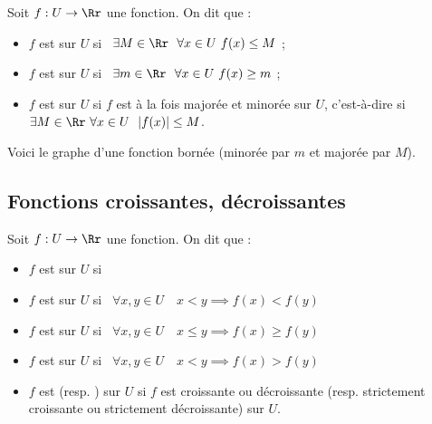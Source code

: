 \documentclass[class=report,crop=false]{standalone}
\begin{document}
\begin{definition}
Soit $f:U\to \Rr$ une fonction. On dit que :
\begin{itemize}
  \item $f$ est  sur $U$ si \ $\exists M\in\Rr \ \ \forall x\in U \ f(x)\leq M$ ;
  \item $f$ est  sur $U$ si \ $\exists m\in\Rr \ \ \forall x\in U \ f(x)\geq m$ ;
  \item $f$ est  sur $U$ si $f$ est à la fois majorée et minorée sur $U$,
  c'est-à-dire si \ $\exists M\in\Rr \ \forall x\in U \ \ |f(x)|\leq M$.
\end{itemize}
\end{definition}

Voici le graphe d'une fonction bornée (minorée par $m$ et majorée par $M$).

\subsection{Fonctions croissantes, décroissantes}

\begin{definition}
Soit $f:U\to \Rr$ une fonction. On dit que :
\medskip
\begin{itemize}
  \item $f$ est  sur $U$ si\ 

  \medskip

  \item $f$ est  sur $U$ si \ 
  $\forall x,y\in U \quad  x< y \implies f(x)< f(y)$

  \item $f$ est   sur $U$ si
  \ $\forall x,y\in U \quad  x\leq y \implies f(x)\geq f(y)$

  \item $f$ est  sur $U$ si
  \ $\forall x,y\in U \quad  x< y \implies f(x)> f(y)$

 \item $f$ est  (resp. ) sur $U$ si
 $f$ est croissante ou décroissante (resp. strictement croissante ou
 strictement décroissante) sur $U$.
\end{itemize}
\end{definition}
\end{document}
